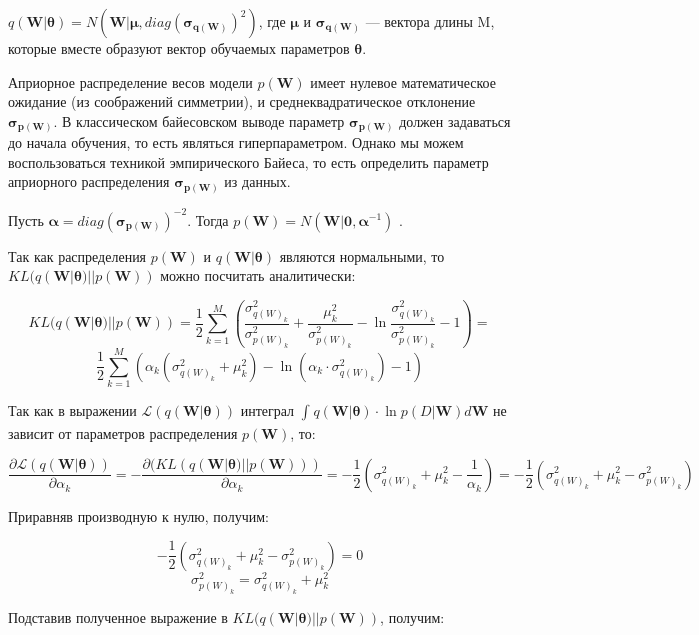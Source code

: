 \documentclass{article}
\begin{document}
$q(\mathbf{W} | \pmb{\theta}) = N(\mathbf{W} | \pmb{\mu}, diag(\pmb{\sigma_{q(\mathbf{W})}})^{2})$, где $\pmb{\mu}$ и $\pmb{\sigma_{q(\mathbf{W})}}$ — вектора длины M, которые вместе образуют вектор обучаемых параметров $\pmb{\theta}$.

Априорное распределение весов модели $p(\mathbf{W})$ имеет нулевое математическое ожидание (из соображений симметрии), и среднеквадратическое отклонение $\pmb{\sigma_{p(\mathbf{W})}}$. В классическом байесовском выводе параметр $\pmb{\sigma_{p(\mathbf{W})}}$ должен задаваться до начала обучения, то есть являться гиперпараметром. Однако мы можем воспользоваться техникой эмпирического Байеса, то есть определить параметр  априорного распределения $\pmb{\sigma_{p(\mathbf{W})}}$ из данных.

Пусть $\pmb{\alpha} = diag(\pmb{\sigma_{p(\mathbf{W})}})^{-2}$. Тогда
$
p(\mathbf{W}) =
N(\mathbf{W} | \mathbf{0}, \pmb{\alpha}^{-1})$
.

Так как распределения $p(\mathbf{W})$ и $q(\mathbf{W} | \pmb{\theta})$ являются нормальными, то $KL(q(\mathbf{W} | \pmb{\theta}) || p(\mathbf{W}))$ можно посчитать аналитически:

\[
KL(q(\mathbf{W} | \pmb{\theta}) || p(\mathbf{W})) =
\dfrac{1}{2}\sum_{k=1}^{M}(\dfrac{\sigma_{{q(W)_{k}}}^2}{\sigma_{{p(W)_{k}}}^2} + \dfrac{\mu_{k}^2}{\sigma_{{p(W)_{k}}}^2} - \ln{\dfrac{\sigma_{{q(W)_{k}}}^2}{\sigma_{{p(W)_{k}}}^2}} - 1) =
\]\[
\dfrac{1}{2}\sum_{k=1}^{M}(\alpha_k (\sigma_{{q(W)_{k}}}^2 + \mu_{k}^2) - \ln{(\alpha_k \cdot \sigma_{{q(W)_{k}}}^2)} - 1)
\]

Так как в выражении
$\mathcal{L}(q(\mathbf{W} | \pmb{\theta}))$
интеграл
$\int_{}{} q(\mathbf{W} | \pmb{\theta}) \cdot \ln{p(D | \mathbf{W})} d\mathbf{W}$
не зависит от параметров распределения $p(\mathbf{W})$, то:

\[
\dfrac{\partial \mathcal{L}(q(\mathbf{W} | \pmb{\theta}))}{\partial {\alpha_k}} =
- \dfrac{\partial (KL(q(\mathbf{W} | \pmb{\theta}) || p(\mathbf{W})))}{\partial {\alpha_k}} =
-\dfrac{1}{2}(\sigma_{{q(W)_{k}}}^2 + \mu_{k}^2 - \dfrac{1}{\alpha_k}) =
-\dfrac{1}{2}(\sigma_{{q(W)_{k}}}^2 + \mu_{k}^2 - \sigma_{{p(W)_{k}}}^2)
\]

Приравняв производную к нулю, получим:

\[
-\dfrac{1}{2}(\sigma_{{q(W)_{k}}}^2 + \mu_{k}^2 - \sigma_{{p(W)_{k}}}^2) = 0
\]
\[
\sigma_{{p(W)_{k}}}^2 = \sigma_{{q(W)_{k}}}^2 + \mu_{k}^2
\]

Подставив полученное выражение в $KL(q(\mathbf{W} | \pmb{\theta}) || p(\mathbf{W}))$, получим:
\end{document}
